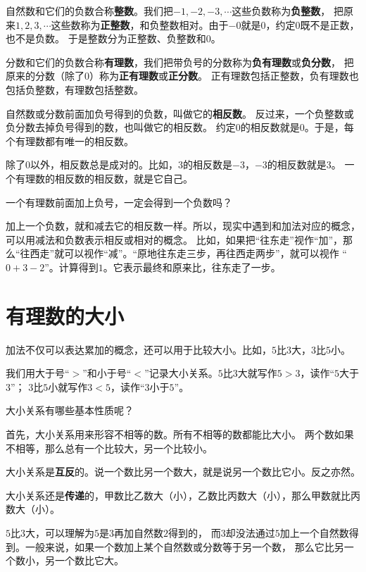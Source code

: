 \documentclass[12pt,UTF8,fontset=none]{ctexbook}
\begin{document}
自然数和它们的负数合称\textbf{整数}。我们把$-1, -2, -3, \cdots$这些负数称为\textbf{负整数}，
把原来$1,2,3,\cdots$这些数称为\textbf{正整数}，和负整数相对。由于$-0$就是$0$，约定$0$既不是正数，也不是负数。
于是整数分为正整数、负整数和$0$。

分数和它们的负数合称\textbf{有理数}，我们把带负号的分数称为\textbf{负有理数}或\textbf{负分数}，
把原来的分数（除了$0$）称为\textbf{正有理数}或\textbf{正分数}。
正有理数包括正整数，负有理数也包括负整数，有理数包括整数。

自然数或分数前面加负号得到的负数，叫做它的\textbf{相反数}。
反过来，一个负整数或负分数去掉负号得到的数，也叫做它的相反数。
约定$0$的相反数就是$0$。于是，每个有理数都有唯一的相反数。

除了$0$以外，相反数总是成对的。比如，$3$的相反数是$-3$，$-3$的相反数就是$3$。
一个有理数的相反数的相反数，就是它自己。

\begin{sk}\label{sk:0-0-0}
    一个有理数前面加上负号，一定会得到一个负数吗？
\end{sk}

加上一个负数，就和减去它的相反数一样。所以，现实中遇到和加法对应的概念，可以用减法和负数表示相反或相对的概念。
比如，如果把“往东走”视作“加”，那么“往西走”就可以视作“减”。“原地往东走三步，再往西走两步”，就可以视作
“$0+3-2$”。计算得到$1$。它表示最终和原来比，往东走了一步。

\section{有理数的大小}
加法不仅可以表达累加的概念，还可以用于比较大小。比如，$5$比$3$大，$3$比$5$小。

我们用大于号“$>$”和小于号“$<$”记录大小关系。$5$比$3$大就写作$5>3$，读作“$5$大于$3$”；
$3$比$5$小就写作$3<5$，读作“$3$小于$5$”。

大小关系有哪些基本性质呢？

首先，大小关系用来形容不相等的数。所有不相等的数都能比大小。
两个数如果不相等，那么总有一个比较大，另一个比较小。

大小关系是\textbf{互反}的。说一个数比另一个数大，就是说另一个数比它小。反之亦然。

大小关系还是\textbf{传递}的，甲数比乙数大（小），乙数比丙数大（小），那么甲数就比丙数大（小）。

$5$比$3$大，可以理解为$5$是$3$再加自然数$2$得到的，
而$3$却没法通过$5$加上一个自然数得到。一般来说，如果一个数加上某个自然数或分数等于另一个数，
那么它比另一个数小，另一个数比它大。
\end{document}
